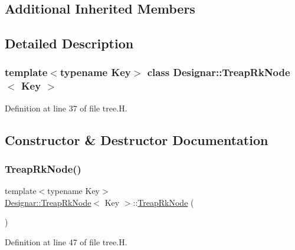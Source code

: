 \subsection*{Additional Inherited Members}


\subsection{Detailed Description}
\subsubsection*{template$<$typename Key$>$\newline
class Designar\+::\+Treap\+Rk\+Node$<$ Key $>$}



Definition at line 37 of file tree.\+H.



\subsection{Constructor \& Destructor Documentation}
\mbox{\label{class_designar_1_1_treap_rk_node_a477ff390f32fe63244a0d69fb29fe72d}} 
\subsubsection{\texorpdfstring{Treap\+Rk\+Node()}{TreapRkNode()}\hspace{0.1cm}{\footnotesize\ttfamily [1/4]}}
{\footnotesize\ttfamily template$<$typename Key$>$ \\
\hyperlink{class_designar_1_1_treap_rk_node}{Designar\+::\+Treap\+Rk\+Node}$<$ Key $>$\+::\hyperlink{class_designar_1_1_treap_rk_node}{Treap\+Rk\+Node} (\begin{DoxyParamCaption}{ }\end{DoxyParamCaption})\hspace{0.3cm}{\ttfamily [inline]}}



Definition at line 47 of file tree.\+H.

\mbox{\label{class_designar_1_1_treap_rk_node_af478d4d739e9f7cacf8337421f3dabcb}} 
